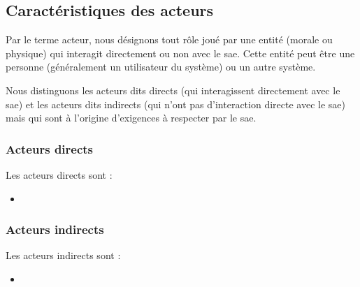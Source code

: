 \subsection{Caractéristiques des acteurs} %

Par le terme acteur, nous désignons tout rôle joué par une entité (morale ou physique) qui interagit directement ou non avec le \gls{sae}. Cette entité peut être une personne (généralement un utilisateur du système) ou un autre système.

Nous distinguons les acteurs dits directs (qui interagissent directement avec le \gls{sae}) et les acteurs dits indirects (qui n’ont pas d’interaction directe avec le \gls{sae}) mais qui sont à l’origine d’exigences à respecter par le \gls{sae}.

\subsubsection{Acteurs directs} %

Les acteurs directs sont :
\begin{itemize}
    \item \complete
\end{itemize}


\subsubsection{Acteurs indirects} %

Les acteurs indirects sont :
\begin{itemize}
    \item \complete
\end{itemize}